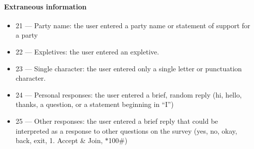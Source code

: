 \documentclass[12pt]{article}
\begin{document}
\paragraph{Extraneous information}
\begin{itemize}
\item 21 --- Party name: the user entered a party name or statement of support for a party
\item 22 --- Expletives: the user entered an expletive. 
\item 23 --- Single character: the user entered only a single letter or punctuation character. 
\item 24 --- Personal responses: the user entered a brief, random reply (hi, hello, thanks, a question, or a statement beginning in ``I'') 
\item 25 --- Other responses: the user entered a brief reply that could be interpreted as a response to other questions on the survey (yes, no, okay, back, exit, 1. Accept \& Join, $\ast$100\#) 
\end{itemize}
\end{document}
